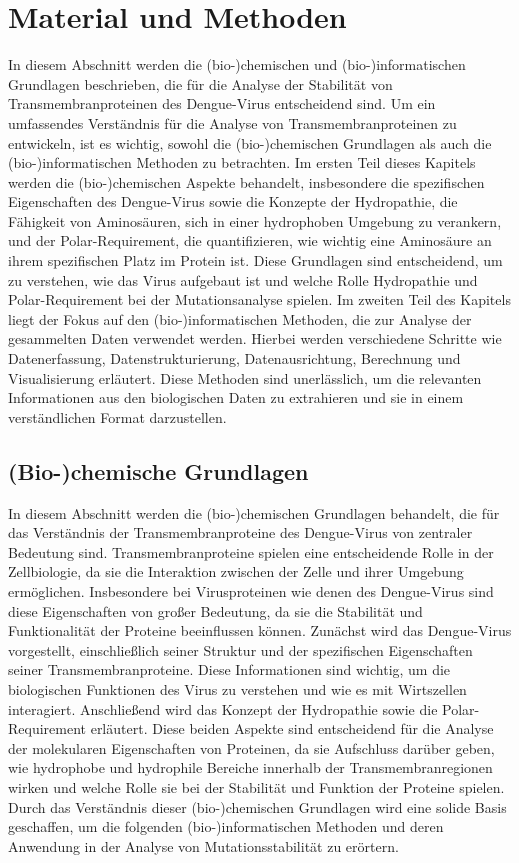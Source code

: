 \documentclass[german,version-2022-01]{uzl-thesis}
\begin{document}
\chapter{Material und Methoden}%
\label{chapter-use}
In diesem Abschnitt werden die (bio-)chemischen und (bio-)informatischen Grundlagen beschrieben, die f\"ur die Analyse der Stabilit\"at von Transmembranproteinen des Dengue-Virus entscheidend sind. Um ein umfassendes Verst\"andnis f\"ur die Analyse von Transmembranproteinen zu entwickeln, ist es wichtig, sowohl die (bio-)chemischen Grundlagen als auch die (bio-)informatischen Methoden zu betrachten. Im ersten Teil dieses Kapitels werden die (bio-)chemischen Aspekte behandelt, insbesondere die spezifischen Eigenschaften des Dengue-Virus sowie die Konzepte der Hydropathie, die F\"ahigkeit von Aminos\"auren, sich in einer hydrophoben Umgebung zu verankern, und der Polar-Requirement, die quantifizieren, wie wichtig eine Aminos\"aure an ihrem spezifischen Platz im Protein ist. Diese Grundlagen sind entscheidend, um zu verstehen, wie das Virus aufgebaut ist und welche Rolle Hydropathie und Polar-Requirement bei der Mutationsanalyse spielen. Im zweiten Teil des Kapitels liegt der Fokus auf den (bio-)informatischen Methoden, die zur Analyse der gesammelten Daten verwendet werden. Hierbei werden verschiedene Schritte wie Datenerfassung, Datenstrukturierung, Datenausrichtung, Berechnung und Visualisierung erl\"autert. Diese Methoden sind unerl\"asslich, um die relevanten Informationen aus den biologischen Daten zu extrahieren und sie in einem verst\"andlichen Format darzustellen. 

\section{(Bio-)chemische Grundlagen}
In diesem Abschnitt werden die (bio-)chemischen Grundlagen behandelt, die f\"ur das Verst\"andnis der Transmembranproteine des Dengue-Virus von zentraler Bedeutung sind. Transmembranproteine spielen eine entscheidende Rolle in der Zellbiologie, da sie die Interaktion zwischen der Zelle und ihrer Umgebung erm\"oglichen. Insbesondere bei Virusproteinen wie denen des Dengue-Virus sind diese Eigenschaften von gro\ss{}er Bedeutung, da sie die Stabilit\"at und Funktionalit\"at der Proteine beeinflussen k\"onnen. Zun\"achst wird das Dengue-Virus vorgestellt, einschlie\ss{}lich seiner Struktur und der spezifischen Eigenschaften seiner Transmembranproteine. Diese Informationen sind wichtig, um die biologischen Funktionen des Virus zu verstehen und wie es mit Wirtszellen interagiert. Anschlie\ss{}end wird das Konzept der Hydropathie sowie die Polar-Requirement erl\"autert. Diese beiden Aspekte sind entscheidend f\"ur die Analyse der molekularen Eigenschaften von Proteinen, da sie Aufschluss dar\"uber geben, wie hydrophobe und hydrophile Bereiche innerhalb der Transmembranregionen wirken und welche Rolle sie bei der Stabilit\"at und Funktion der Proteine spielen. Durch das Verst\"andnis dieser (bio-)chemischen Grundlagen wird eine solide Basis geschaffen, um die folgenden (bio-)informatischen Methoden und deren Anwendung in der Analyse von Mutationsstabilit\"at zu er\"ortern.
\end{document}

